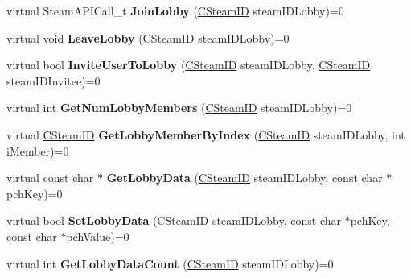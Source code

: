 \begin{DoxyCompactItemize}
\mbox{\label{class_i_steam_matchmaking_a8dc517d730ddaa8311816244ceeac287}} 
virtual Steam\+A\+P\+I\+Call\+\_\+t {\bfseries Join\+Lobby} (\hyperlink{class_c_steam_i_d}{C\+Steam\+ID} steam\+I\+D\+Lobby)=0
\item 
\mbox{\label{class_i_steam_matchmaking_a2a13b13352f6df85977dff74c4ddcd5d}} 
virtual void {\bfseries Leave\+Lobby} (\hyperlink{class_c_steam_i_d}{C\+Steam\+ID} steam\+I\+D\+Lobby)=0
\item 
\mbox{\label{class_i_steam_matchmaking_a08c063280445302f22b028986f51cb24}} 
virtual bool {\bfseries Invite\+User\+To\+Lobby} (\hyperlink{class_c_steam_i_d}{C\+Steam\+ID} steam\+I\+D\+Lobby, \hyperlink{class_c_steam_i_d}{C\+Steam\+ID} steam\+I\+D\+Invitee)=0
\item 
\mbox{\label{class_i_steam_matchmaking_aac140a79a6024335b3779cfd68f6d925}} 
virtual int {\bfseries Get\+Num\+Lobby\+Members} (\hyperlink{class_c_steam_i_d}{C\+Steam\+ID} steam\+I\+D\+Lobby)=0
\item 
\mbox{\label{class_i_steam_matchmaking_af482f04ee3661cce04ad736b596cd0bd}} 
virtual \hyperlink{class_c_steam_i_d}{C\+Steam\+ID} {\bfseries Get\+Lobby\+Member\+By\+Index} (\hyperlink{class_c_steam_i_d}{C\+Steam\+ID} steam\+I\+D\+Lobby, int i\+Member)=0
\item 
\mbox{\label{class_i_steam_matchmaking_a4a06e468689eae616b1d7c42a7a974e1}} 
virtual const char $\ast$ {\bfseries Get\+Lobby\+Data} (\hyperlink{class_c_steam_i_d}{C\+Steam\+ID} steam\+I\+D\+Lobby, const char $\ast$pch\+Key)=0
\item 
\mbox{\label{class_i_steam_matchmaking_a70674d1431d8213b0401ac85b0e9ff12}} 
virtual bool {\bfseries Set\+Lobby\+Data} (\hyperlink{class_c_steam_i_d}{C\+Steam\+ID} steam\+I\+D\+Lobby, const char $\ast$pch\+Key, const char $\ast$pch\+Value)=0
\item 
\mbox{\label{class_i_steam_matchmaking_ab97a7c5766d3b6d412ac472b21aef311}} 
virtual int {\bfseries Get\+Lobby\+Data\+Count} (\hyperlink{class_c_steam_i_d}{C\+Steam\+ID} steam\+I\+D\+Lobby)=0

\end{DoxyCompactItemize}
